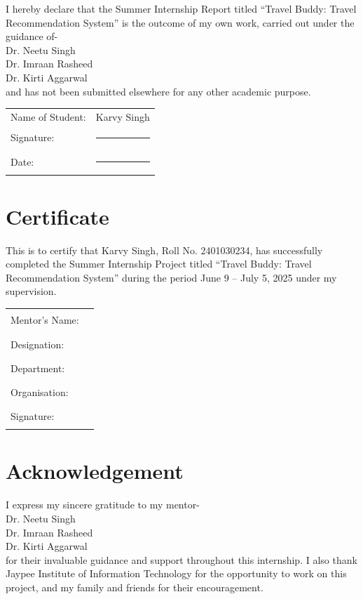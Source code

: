 \documentclass[12pt,a4paper]{article}
\begin{document}
I hereby declare that the Summer Internship Report titled “Travel Buddy: Travel Recommendation System” is the outcome of my own work, carried out under the guidance of-\\
Dr. Neetu Singh\\	
Dr. Imraan Rasheed  \\
Dr. Kirti Aggarwal  \\
and has not been submitted elsewhere for any other academic purpose.

\vspace{3cm}
\noindent
\begin{tabular}{@{}l@{\quad}l}
  Name of Student: & Karvy Singh \\
  Signature:       & \rule{4cm}{0.4pt} \\
  Date:            & \rule{4cm}{0.4pt}
\end{tabular}

\newpage
\thispagestyle{empty}
\section*{Certificate}

This is to certify that Karvy Singh, Roll No. 2401030234, has successfully completed the Summer Internship Project titled “Travel Buddy: Travel Recommendation System” during the period June 9 – July 5, 2025 under my supervision.

\vspace{2cm}
\noindent
\begin{tabular}{@{}l@{\quad}l}
  Mentor’s Name:   & \rule{4cm}{0.4pt}\\
  Designation:     & \rule{4cm}{0.4pt} \\
  Department:      & \rule{4cm}{0.4pt} \\
  Organisation:    & \rule{4cm}{0.4pt} \\
  Signature:       & \rule{4cm}{0.4pt}
\end{tabular}

\newpage
\thispagestyle{empty}
\section*{Acknowledgement}

I express my sincere gratitude to my mentor-\\ 
Dr. Neetu Singh\\	
Dr. Imraan Rasheed  \\
Dr. Kirti Aggarwal  \\
for their invaluable guidance and support throughout this internship. I also thank Jaypee Institute of Information Technology for the opportunity to work on this project, and my family and friends for their encouragement.
\end{document}
